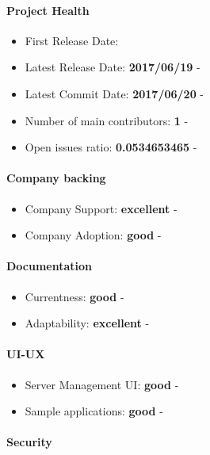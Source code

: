 \documentclass{article}
\begin{document}
\paragraph{Project Health}

\begin{itemize}
\item First Release Date: 
\item Latest Release Date: \textbf{2017/06/19} - 
\item Latest Commit Date: \textbf{2017/06/20} - 
\item Number of main contributors: \textbf{1} - 
\item Open issues ratio: \textbf{0.0534653465} - 
\end{itemize}

\paragraph{Company backing}

\begin{itemize}
\item Company Support: \textbf{excellent} - 
\item Company Adoption: \textbf{good} - 
\end{itemize}

\paragraph{Documentation}

\begin{itemize}
\item Currentness: \textbf{good} - 
\item Adaptability: \textbf{excellent} - 
\end{itemize}

\paragraph{UI-UX}

\begin{itemize}
\item Server Management UI: \textbf{good} - 
\item Sample applications: \textbf{good} - 
\end{itemize}

\paragraph{Security} 
\end{document}
